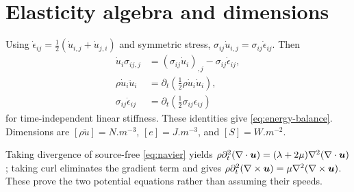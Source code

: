 \chapter{Elasticity algebra and dimensions}\label{app:elasticity}
Using $\dot\epsilon_{ij}=\tfrac12(\dot u_{i,j}+\dot u_{j,i})$ and symmetric
stress, $\sigma_{ij}\dot u_{i,j}=\sigma_{ij}\dot\epsilon_{ij}$. Then
\begin{align}
\dot u_i\sigma_{ij,j}&=(\sigma_{ij}\dot u_i)_{,j}-\sigma_{ij}\dot\epsilon_{ij},\\
\rho\dot u_i\ddot u_i&=\partial_t(\tfrac12\rho\dot u_i\dot u_i),\\
\sigma_{ij}\dot\epsilon_{ij}&=\partial_t(\tfrac12\sigma_{ij}\epsilon_{ij})
\end{align}
for time-independent linear stiffness. These identities give
\cref{eq:energy-balance}. Dimensions are
$[\rho\ddot u]=\si{N.m^{-3}}$, $[e]=\si{J.m^{-3}}$, and
$[S]=\si{W.m^{-2}}$.

Taking divergence of source-free \cref{eq:navier} yields
$\rho\partial_t^2(\nabla\cdot\bm{u})=(\lambda+2\mu)\nabla^2(\nabla\cdot\bm{u})$;
taking curl eliminates the gradient term and gives
$\rho\partial_t^2(\nabla\times\bm{u})=\mu\nabla^2(\nabla\times\bm{u})$.
These prove the two potential equations rather than assuming their speeds.
